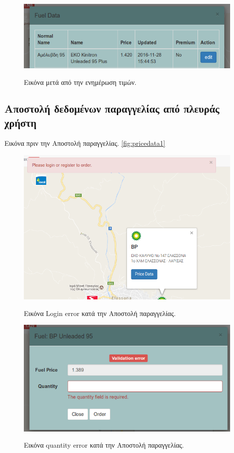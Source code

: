 \begin{figure}[H]
  \caption{Εικόνα μετά από την ενημέρωση τιμών.}
  \centering
    \includegraphics[width=1\textwidth]{img/after-edit.png}
    \label{fig:after-edit}
\end{figure}

\subsection{Αποστολή δεδομένων παραγγελίας από πλευράς χρήστη}

Εικόνα πριν την Αποστολή παραγγελίας. \ref{fig:pricedata1}

\begin{figure}[H]
  \caption{Εικόνα Login error κατά την Αποστολή παραγγελίας.}
  \centering
    \includegraphics[width=1\textwidth]{img/make-order-error.png}
    \label{fig:make-order-error}
\end{figure}

\begin{figure}[H]
  \caption{Εικόνα quantity error κατά την Αποστολή παραγγελίας.}
  \centering
    \includegraphics[width=1\textwidth]{img/make-order-error2.png}
    \label{fig:make-order-error2}
\end{figure}

